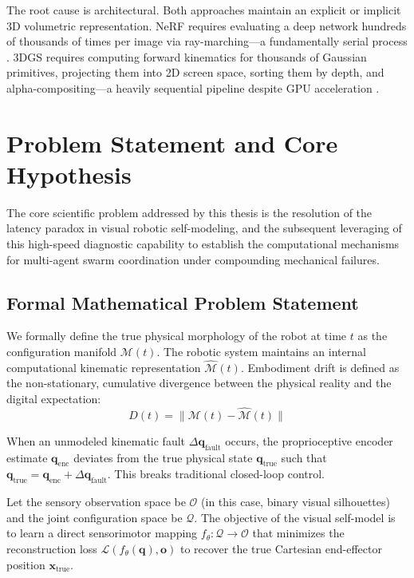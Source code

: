 \documentclass[12pt,a4paper,oneside]{report}
\begin{document}
The root cause is architectural. Both approaches maintain an explicit or implicit 3D volumetric representation. NeRF requires evaluating a deep network hundreds of thousands of times per image via ray-marching---a fundamentally serial process \cite{mildenhall2020nerf}. 3DGS requires computing forward kinematics for thousands of Gaussian primitives, projecting them into 2D screen space, sorting them by depth, and alpha-compositing---a heavily sequential pipeline despite GPU acceleration \cite{kerbl20233d}.

\section{Problem Statement and Core Hypothesis}
\label{sec:problem_hypothesis_intro}

The core scientific problem addressed by this thesis is the resolution of the latency paradox in visual robotic self-modeling, and the subsequent leveraging of this high-speed diagnostic capability to establish the computational mechanisms for multi-agent swarm coordination under compounding mechanical failures.

\subsection{Formal Mathematical Problem Statement}
\label{subsec:formal_mathematical_problem_statement_intro}

We formally define the true physical morphology of the robot at time $t$ as the configuration manifold $\mathcal{M}(t)$. The robotic system maintains an internal computational kinematic representation $\hat{\mathcal{M}}(t)$. Embodiment drift is defined as the non-stationary, cumulative divergence between the physical reality and the digital expectation:
\begin{equation}
D(t) = \|\mathcal{M}(t) - \hat{\mathcal{M}}(t)\|
\end{equation}

When an unmodeled kinematic fault $\Delta \mathbf{q}_{\text{fault}}$ occurs, the proprioceptive encoder estimate $\mathbf{q}_{\text{enc}}$ deviates from the true physical state $\mathbf{q}_{\text{true}}$ such that $\mathbf{q}_{\text{true}} = \mathbf{q}_{\text{enc}} + \Delta \mathbf{q}_{\text{fault}}$. This breaks traditional closed-loop control. 

Let the sensory observation space be $\mathcal{O}$ (in this case, binary visual silhouettes) and the joint configuration space be $\mathcal{Q}$. The objective of the visual self-model is to learn a direct sensorimotor mapping $f_\theta: \mathcal{Q} \rightarrow \mathcal{O}$ that minimizes the reconstruction loss $\mathcal{L}(f_\theta(\mathbf{q}), \mathbf{o})$ to recover the true Cartesian end-effector position $\mathbf{x}_{\text{true}}$. 
\end{document}

